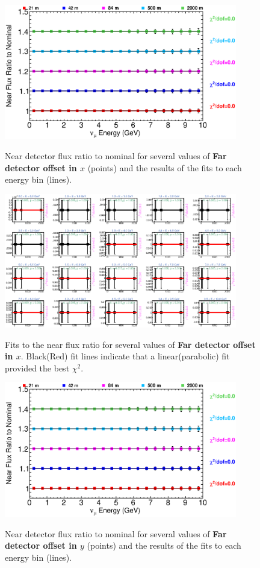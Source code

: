 \begin{figure}[ht]
  \begin{center}
    {\includegraphics[width=4.0in]{figures/LBNEFDX_near_summary.eps}}
  \end{center}
\caption{ Near detector flux ratio to nominal for several values of {\bf Far detector offset in $x$} (points) and the results of the fits to each energy bin (lines).}
\end{figure}

\begin{figure}[hb]
  \begin{center}
    {\includegraphics[width=4.0in]{figures/LBNEFDX_near_fits.eps}}
  \end{center}
\caption{ Fits to the near flux ratio for several values of {\bf Far detector offset in $x$}. Black(Red) fit lines indicate that a linear(parabolic) fit provided the best $\chi^2$. }
\end{figure}

\begin{figure}[ht]
  \begin{center}
    {\includegraphics[width=4.0in]{figures/LBNEFDY_near_summary.eps}}
  \end{center}
\caption{ Near detector flux ratio to nominal for several values of {\bf Far detector offset in $y$} (points) and the results of the fits to each energy bin (lines).}
\end{figure}

